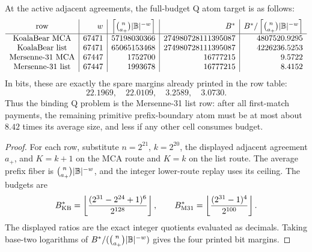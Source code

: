 \documentclass[11pt,a4paper]{amsart}
\numberwithin{equation}{section}
\theoremstyle{remark}
\begin{document}
\begin{proposition}\label{prop:q-exact-target}
At the active adjacent agreements, the full-budget Q atom target is as follows:
\[
\begin{array}{c|r|r|r|r}
\text{row} & w & \left\lceil \binom n{a_+}|\mathbb B|^{-w}\right\rceil & B^* & B^*/\left\lceil \binom n{a_+}|\mathbb B|^{-w}\right\rceil\\
\hline
\text{KoalaBear MCA} & 67471 & 57198030366 & 274980728111395087 & 4807520.9295\\
\text{KoalaBear list} & 67471 & 65065153468 & 274980728111395087 & 4226236.5253\\
\text{Mersenne-31 MCA} & 67447 & 1752700 & 16777215 & 9.5722\\
\text{Mersenne-31 list} & 67447 & 1993678 & 16777215 & 8.4152
\end{array}
\]
In bits, these are exactly the spare margins already printed in the row table:
\[
        22.1969,
        \quad 22.0109,
        \quad 3.2589,
        \quad 3.0730 .
\]
Thus the binding Q problem is the Mersenne-31 list row: after all first-match payments, the remaining primitive prefix-boundary atom must be at most about \(8.42\) times its average size, and less if any other cell consumes budget.
\end{proposition}

\begin{proof}
For each row, substitute \(n=2^{21}\), \(k=2^{20}\), the displayed adjacent agreement \(a_+\), and \(K=k+1\) on the MCA route and \(K=k\) on the list route.  The average prefix fiber is \(\binom n{a_+}|\mathbb B|^{-w}\), and the integer lower-route replay uses its ceiling.  The budgets are
\[
        B^*_{\rm KB}=\left\lfloor\frac{(2^{31}-2^{24}+1)^6}{2^{128}}\right\rfloor,
        \qquad
        B^*_{\rm M31}=\left\lfloor\frac{(2^{31}-1)^4}{2^{100}}\right\rfloor .
\]
The displayed ratios are the exact integer quotients evaluated as decimals.  Taking base-two logarithms of \(B^*/(\binom n{a_+}|\mathbb B|^{-w})\) gives the four printed bit margins.
\end{proof}
\end{document}
